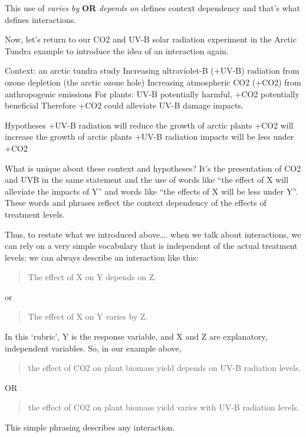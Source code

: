 \documentclass[
]{book}
\begin{document}
This use of \emph{varies by} \textbf{OR} \emph{depends on} defines context dependency and that's what defines interactions.

Now, let's return to our CO2 and UV-B solar radiation experiment in the Arctic Tundra example to introduce the idea of an interaction again.

Context: an arctic tundra study
Increasing ultraviolet-B (+UV-B) radiation from ozone depletion (the arctic ozone hole)
Increasing atmospheric CO2 (+CO2) from anthropogenic emissions
For plants: UV-B potentially harmful, +CO2 potentially beneficial
Therefore +CO2 could alleviate UV-B damage impacts.

Hypotheses
+UV-B radiation will reduce the growth of arctic plants
+CO2 will increase the growth of arctic plants
+UV-B radiation impacts will be less under +CO2

What is unique about these context and hypotheses? It's the presentation of CO2 and UVB in the same statement and the use of words like ``the effect of X will alleviate the impacts of Y'' and words like ``the effects of X will be less under Y''. These words and phrases reflect the context dependency of the effects of treatment levels.

Thus, to restate what we introduced above\ldots. when we talk about interactions, we can rely on a very simple vocabulary that is independent of the actual treatment levels: we can always describe an interaction like this:

\begin{quote}
The effect of X on Y depends on Z.
\end{quote}

or

\begin{quote}
The effect of X on Y varies by Z.
\end{quote}

In this `rubric', Y is the response variable, and X and Z are explanatory, independent variables. So, in our example above,

\begin{quote}
the effect of CO2 on plant biomass yield depends on UV-B radiation levels.
\end{quote}

OR

\begin{quote}
the effect of CO2 on plant biomass yield varies with UV-B radiation levels.
\end{quote}

This simple phrasing describes any interaction.
\end{document}
